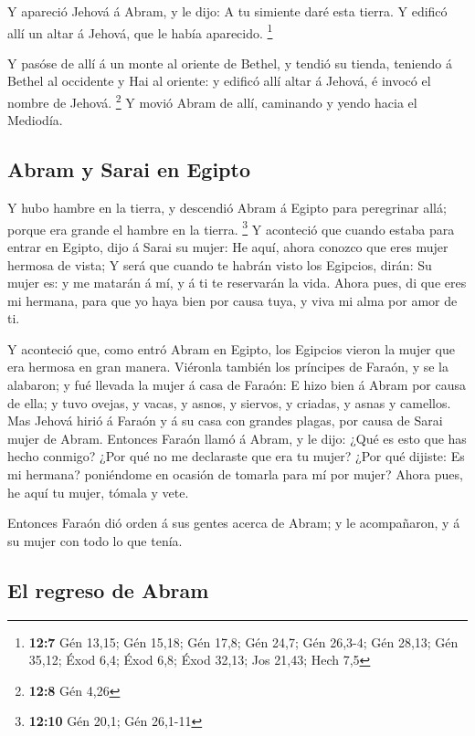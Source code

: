  Y apareció Jehová á Abram, y le dijo: A tu simiente daré
esta tierra. Y edificó allí un altar á Jehová, que le había aparecido.
\footnote{\textbf{12:7} Gén 13,15; Gén 15,18; Gén 17,8; Gén 24,7; Gén
  26,3-4; Gén 28,13; Gén 35,12; Éxod 6,4; Éxod 6,8; Éxod 32,13; Jos
  21,43; Hech 7,5}

 Y pasóse de allí á un monte al oriente de Bethel, y tendió
su tienda, teniendo á Bethel al occidente y Hai al oriente: y edificó
allí altar á Jehová, é invocó el nombre de Jehová. \footnote{\textbf{12:8}
  Gén 4,26}  Y movió Abram de allí, caminando y yendo hacia
el Mediodía.

\hypertarget{abram-y-sarai-en-egipto}{%
\subsection{Abram y Sarai en Egipto}\label{abram-y-sarai-en-egipto}}

 Y hubo hambre en la tierra, y descendió Abram á Egipto
para peregrinar allá; porque era grande el hambre en la tierra.
\footnote{\textbf{12:10} Gén 20,1; Gén 26,1-11}  Y
aconteció que cuando estaba para entrar en Egipto, dijo á Sarai su
mujer: He aquí, ahora conozco que eres mujer hermosa de vista;
 Y será que cuando te habrán visto los Egipcios, dirán: Su
mujer es: y me matarán á mí, y á ti te reservarán la vida. 
Ahora pues, di que eres mi hermana, para que yo haya bien por causa
tuya, y viva mi alma por amor de ti.

 Y aconteció que, como entró Abram en Egipto, los Egipcios
vieron la mujer que era hermosa en gran manera.  Viéronla
también los príncipes de Faraón, y se la alabaron; y fué llevada la
mujer á casa de Faraón:  E hizo bien á Abram por causa de
ella; y tuvo ovejas, y vacas, y asnos, y siervos, y criadas, y asnas y
camellos.  Mas Jehová hirió á Faraón y á su casa con
grandes plagas, por causa de Sarai mujer de Abram. 
Entonces Faraón llamó á Abram, y le dijo: ¿Qué es esto que has hecho
conmigo? ¿Por qué no me declaraste que era tu mujer?  ¿Por
qué dijiste: Es mi hermana? poniéndome en ocasión de tomarla para mí por
mujer? Ahora pues, he aquí tu mujer, tómala y vete.

 Entonces Faraón dió orden á sus gentes acerca de Abram; y
le acompañaron, y á su mujer con todo lo que tenía.

\hypertarget{el-regreso-de-abram}{%
\subsection{El regreso de Abram}\label{el-regreso-de-abram}}

